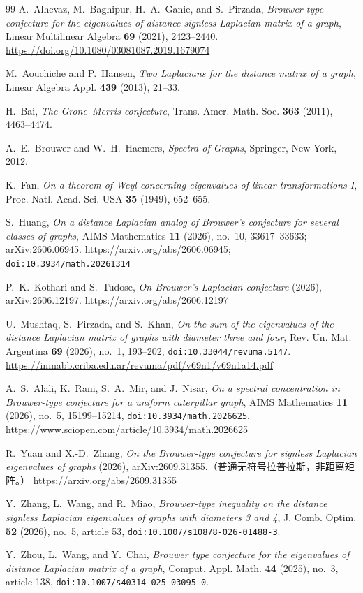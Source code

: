 \documentclass[11pt,a4paper]{article}
\theoremstyle{remark}
\begin{document}
\begin{thebibliography}{99}
A.~Alhevaz, M.~Baghipur, H.~A.~Ganie, and S.~Pirzada,
\emph{Brouwer type conjecture for the eigenvalues of distance signless Laplacian matrix of a graph},
Linear Multilinear Algebra \textbf{69} (2021), 2423--2440.
\url{https://doi.org/10.1080/03081087.2019.1679074}

M.~Aouchiche and P.~Hansen,
\emph{Two Laplacians for the distance matrix of a graph},
Linear Algebra Appl. \textbf{439} (2013), 21--33.

H.~Bai,
\emph{The Grone--Merris conjecture},
Trans. Amer. Math. Soc. \textbf{363} (2011), 4463--4474.

A.~E.~Brouwer and W.~H.~Haemers,
\emph{Spectra of Graphs},
Springer, New York, 2012.

K.~Fan,
\emph{On a theorem of Weyl concerning eigenvalues of linear transformations I},
Proc. Natl. Acad. Sci. USA \textbf{35} (1949), 652--655.

S.~Huang,
\emph{On a distance Laplacian analog of Brouwer's conjecture for several classes of graphs},
AIMS Mathematics \textbf{11} (2026), no.~10, 33617--33633; arXiv:2606.06945.
\url{https://arxiv.org/abs/2606.06945}; \texttt{doi:10.3934/math.20261314}

P.~K.~Kothari and S.~Tudose,
\emph{On Brouwer's Laplacian conjecture} (2026), arXiv:2606.12197.
\url{https://arxiv.org/abs/2606.12197}

U.~Mushtaq, S.~Pirzada, and S.~Khan,
\emph{On the sum of the eigenvalues of the distance Laplacian matrix of graphs with diameter three and four},
Rev. Un. Mat. Argentina \textbf{69} (2026), no.~1, 193--202, \texttt{doi:10.33044/revuma.5147}.
\url{https://inmabb.criba.edu.ar/revuma/pdf/v69n1/v69n1a14.pdf}

A.~S.~Alali, K.~Rani, S.~A.~Mir, and J.~Nisar,
\emph{On a spectral concentration in Brouwer-type conjecture for a uniform caterpillar graph},
AIMS Mathematics \textbf{11} (2026), no.~5, 15199--15214, \texttt{doi:10.3934/math.2026625}.
\url{https://www.sciopen.com/article/10.3934/math.2026625}

R.~Yuan and X.-D.~Zhang,
\emph{On the Brouwer-type conjecture for signless Laplacian eigenvalues of graphs}
(2026), arXiv:2609.31355.（普通无符号拉普拉斯，非距离矩阵。）
\url{https://arxiv.org/abs/2609.31355}

Y.~Zhang, L.~Wang, and R.~Miao,
\emph{Brouwer-type inequality on the distance signless Laplacian eigenvalues of graphs with diameters 3 and 4},
J. Comb. Optim. \textbf{52} (2026), no.~5, article 53, \texttt{doi:10.1007/s10878-026-01488-3}.

Y.~Zhou, L.~Wang, and Y.~Chai,
\emph{Brouwer type conjecture for the eigenvalues of distance Laplacian matrix of a graph},
Comput. Appl. Math. \textbf{44} (2025), no.~3, article 138, \texttt{doi:10.1007/s40314-025-03095-0}.
\end{thebibliography}
\end{document}
